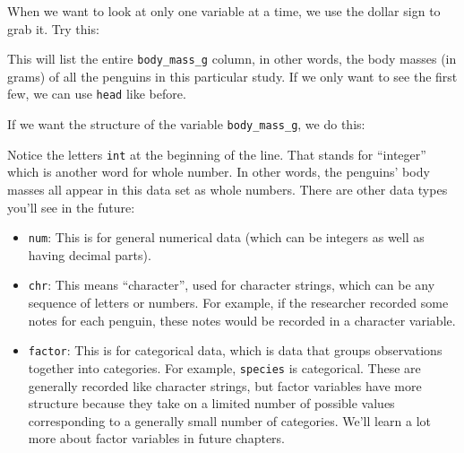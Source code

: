 \documentclass[
]{book}
\newenvironment{Shaded}{\begin{snugshade}}{\end{snugshade}}
\newcommand{\FunctionTok}[1]{\textcolor[rgb]{0.00,0.00,0.00}{#1}}
\newcommand{\NormalTok}[1]{#1}
\newcommand{\SpecialCharTok}[1]{\textcolor[rgb]{0.00,0.00,0.00}{#1}}
\providecommand{\tightlist}{%
  \setlength{\itemsep}{0pt}\setlength{\parskip}{0pt}}
\begin{document}
When we want to look at only one variable at a time, we use the dollar sign to grab it. Try this:

\begin{Shaded}
\end{Shaded}

This will list the entire \texttt{body\_mass\_g} column, in other words, the body masses (in grams) of all the penguins in this particular study. If we only want to see the first few, we can use \texttt{head} like before.

\begin{Shaded}
\end{Shaded}

If we want the structure of the variable \texttt{body\_mass\_g}, we do this:

\begin{Shaded}
\end{Shaded}

Notice the letters \texttt{int} at the beginning of the line. That stands for ``integer'' which is another word for whole number. In other words, the penguins' body masses all appear in this data set as whole numbers. There are other data types you'll see in the future:

\begin{itemize}
\tightlist
\item
  \texttt{num}: This is for general numerical data (which can be integers as well as having decimal parts).
\item
  \texttt{chr}: This means ``character'', used for character strings, which can be any sequence of letters or numbers. For example, if the researcher recorded some notes for each penguin, these notes would be recorded in a character variable.
\item
  \texttt{factor}: This is for categorical data, which is data that groups observations together into categories. For example, \texttt{species} is categorical. These are generally recorded like character strings, but factor variables have more structure because they take on a limited number of possible values corresponding to a generally small number of categories. We'll learn a lot more about factor variables in future chapters.
\end{itemize}
\end{document}
